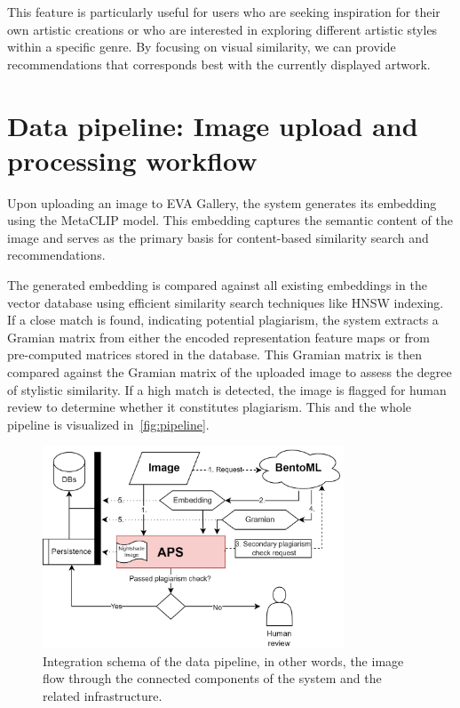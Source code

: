 This feature is particularly useful for users who are seeking inspiration for their own artistic creations or who are interested in exploring different artistic styles within a specific genre. By focusing on visual similarity, we can provide recommendations that corresponds best with the currently displayed artwork.

\newpage

\section{Data pipeline: Image upload and processing workflow}

Upon uploading an image to EVA Gallery, the system generates its embedding using the MetaCLIP model. This embedding captures the semantic content of the image and serves as the primary basis for content-based similarity search and recommendations.

The generated embedding is compared against all existing embeddings in the vector database using efficient similarity search techniques like HNSW indexing. If a close match is found, indicating potential plagiarism, the system extracts a Gramian matrix from either the encoded representation feature maps or from pre-computed matrices stored in the database. This Gramian matrix is then compared against the Gramian matrix of the uploaded image to assess the degree of stylistic similarity. If a high match is detected, the image is flagged for human review to determine whether it constitutes plagiarism. This and the whole pipeline is visualized in~\autoref{fig:pipeline}.

\begin{figure}[ht]
    \centering
    \includegraphics[width=0.8\textwidth]{figs/integ.png}
    \caption{Integration schema of the data pipeline, in other words, the image flow through the connected components of the system and the related infrastructure.}
    \label{fig:pipeline}
\end{figure}

